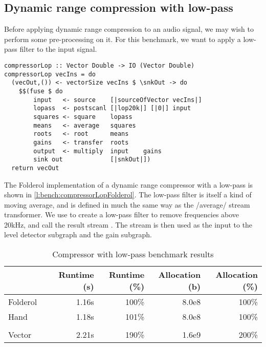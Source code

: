 \subsection{Dynamic range compression with low-pass}
Before applying dynamic range compression to an audio signal, we may wish to perform some pre-processing on it.
For this benchmark, we want to apply a low-pass filter to the input signal.

\begin{lstlisting}[float,label=l:bench:compressorLopFolderol,caption=Folderol implementation of \Hs/compressor/ with low-pass]
compressorLop :: Vector Double -> IO (Vector Double)
compressorLop vecIns = do
  (vecOut,()) <- vectorSize vecIns $ \snkOut -> do
    $$(fuse $ do
        input   <- source    [|sourceOfVector vecIns|]
        lopass  <- postscanl [|lop20k|] [|0|] input
        squares <- square    lopass
        means   <- average   squares
        roots   <- root      means
        gains   <- transfer  roots
        output  <- multiply  input    gains
        sink out             [|snkOut|])
  return vecOut
\end{lstlisting}

The Folderol implementation of a dynamic range compressor with a low-pass is shown in \cref{l:bench:compressorLopFolderol}.
The low-pass filter is itself a kind of moving average, and is defined in much the same way as the \Hs/average/ stream transformer.
We use \Hs@postscanl@ to create a low-pass filter to remove frequencies above 20kHz, and call the result stream \Hs@lopass@.
The \Hs@lopass@ stream is then used as the input to the level detector subgraph and the gain subgraph.

\begin{table}
\begin{center}
\begin{tabular}{ll|rrrr}
& & Runtime (s)  & Runtime (\%) & Allocation (b) & Allocation (\%) \\
\hline
Folderol &          & 1.16s &   100\% & 8.0e8 & 100\% \\
Hand     &          & 1.18s &   101\% & 8.0e8 & 100\% \\
&&&\\
Vector &            & 2.21s &   190\% & 1.6e9 & 200\%\\
\end{tabular}
\end{center}
\caption[Compressor with low-pass benchmark results]{Compressor with low-pass benchmark results}
\label{table:bench:compressorlop}
\end{table}

